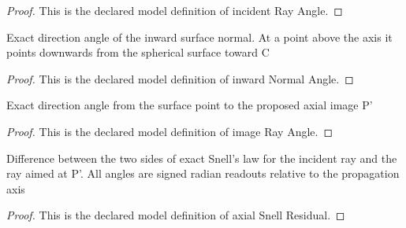 \begin{proof}
  This is the declared model definition of incident Ray Angle.
\end{proof}
\begin{definition}
  \label{def:physics:phyx-mini-0040:phyxminiproblems-problemphyxmini0040-inwardnormalangle}
  Exact direction angle of the inward surface normal. At a point above the axis it points downwards from the spherical surface toward C
\end{definition}
\begin{proof}
  This is the declared model definition of inward Normal Angle.
\end{proof}
\begin{definition}
  \label{def:physics:phyx-mini-0040:phyxminiproblems-problemphyxmini0040-imagerayangle}
  Exact direction angle from the surface point to the proposed axial image P'
\end{definition}
\begin{proof}
  This is the declared model definition of image Ray Angle.
\end{proof}
\begin{definition}
  \label{def:physics:phyx-mini-0040:phyxminiproblems-problemphyxmini0040-axialsnellresidual}
  Difference between the two sides of exact Snell's law for the incident ray and the ray aimed at P'. All angles are signed radian readouts relative to the propagation axis
\end{definition}
\begin{proof}
  This is the declared model definition of axial Snell Residual.
\end{proof}
